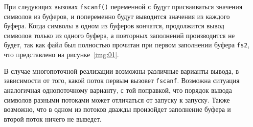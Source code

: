 При следующих вызовах \texttt{fscanf()} переменной \texttt{c} будут
присваиваться значения символов из буферов, и попеременно будут выводится
значения из каждого буфера. Когда символы в одном из буферов кончатся,
продолжится вывод символов только из одного буфера, а повторных заполнений
производится не будет, так как файл был полностью прочитан при первом заполнении
буфера \texttt{fs2}, что представлено на рисунке~\ref{img:01}.

В случае многопоточной реализации возможны различные варианты вывода, в
зависимости от того, какой поток первым вызовет \texttt{fscanf}. Возможна
ситуация аналогичная однопоточному варианту, с той поправкой, что порядок вывода
символов разными потоками может отличаться от запуску к запуску. Также возможно,
что в одном из потоков дважды произойдет заполнение буфера и второй поток ничего
не выведет.

